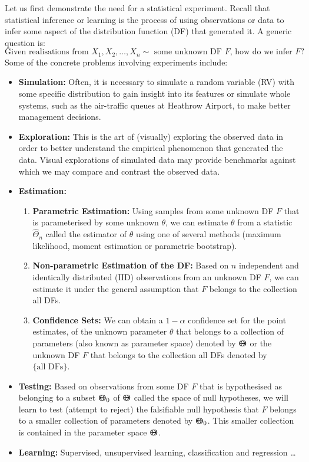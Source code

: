 \documentclass[a4paper]{letter}
\begin{document}
\begin{letter}{}
Let us first demonstrate the need for a statistical experiment.  Recall that statistical inference or learning is the process of using observations or data to infer some aspect of the distribution function (DF) that generated it.  A generic question is:
\[
\text{Given realisations from $X_1, X_2, \ldots, X_n \sim$ some unknown DF $F$, how do we infer $F$} ?
\]
Some of the concrete problems involving experiments include:
\begin{itemize}
\item {\bf Simulation:} Often, it is necessary to simulate a random variable (RV) with some specific distribution to gain insight into its features or simulate whole systems, such as the air-traffic queues at Heathrow Airport, to make better management decisions.
\item {\bf Exploration:} This is the art of (visually) exploring the observed data in order to better understand the empirical phenomenon that generated the data.  Visual explorations of simulated data may provide benchmarks against which we may compare and contrast the observed data.
\item {\bf Estimation:}
\begin{enumerate}
\item {\bf Parametric Estimation:} Using samples from some unknown DF $F$ that is parameterised by some unknown $\theta$, we can estimate $\theta$ from a statistic $\widehat{\Theta}_n$ called the estimator of $\theta$ using one of several methods (maximum likelihood, moment estimation or parametric bootstrap).
\item {\bf Non-parametric Estimation of the DF:}  Based on $n$ independent and identically distributed (IID) observations from an unknown DF $F$, we can estimate it under the general assumption that $F$ belongs to the collection all DFs.
\item {\bf Confidence Sets:}  We can obtain a $1-\alpha$ confidence set for the point estimates, of the unknown parameter $\theta$  that belongs to a collection of parameters (also known as parameter space) denoted by ${\Theta}\mspace{-11 mu}{\Theta}$ or the unknown  DF $F$ that belongs to the collection all DFs denoted by $\{ \text{all DFs} \}$.
\end{enumerate}
\item {\bf Testing:}  Based on observations from some DF $F$ that is hypothesised as belonging to a subset ${\Theta}\mspace{-11 mu}{\Theta}_0$ of ${\Theta}\mspace{-11 mu}{\Theta}$ called the space of null hypotheses, we will learn to test (attempt to reject) the falsifiable null hypothesis that $F$ belongs to a smaller collection of parameters denoted by ${\Theta}\mspace{-11 mu}{\Theta}_0$.  This smaller collection is contained in the parameter space ${\Theta}\mspace{-11 mu}{\Theta}$.
\item {\bf Learning:}  Supervised, unsupervised learning, classification and regression \ldots
\end{itemize}


\end{letter}
\end{document}
